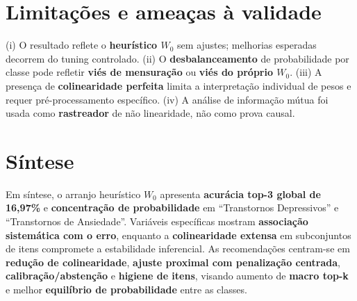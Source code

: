 \documentclass[12pt,a4paper]{article}
\begin{document}
\section{Limitações e ameaças à validade}
(i) O resultado reflete o \textbf{heurístico $W_0$} sem ajustes; melhorias esperadas decorrem do tuning controlado. (ii) O \textbf{desbalanceamento} de probabilidade por classe pode refletir \textbf{viés de mensuração} ou \textbf{viés do próprio $W_0$}. (iii) A presença de \textbf{colinearidade perfeita} limita a interpretação individual de pesos e requer pré-processamento específico. (iv) A análise de informação mútua foi usada como \textbf{rastreador} de não linearidade, não como prova causal.

\section{Síntese}
Em síntese, o arranjo heurístico $W_0$ apresenta \textbf{acurácia top-3 global de 16{,}97\%} e \textbf{concentração de probabilidade} em ``Transtornos Depressivos'' e ``Transtornos de Ansiedade''. Variáveis específicas mostram \textbf{associação sistemática com o erro}, enquanto a \textbf{colinearidade extensa} em subconjuntos de itens compromete a estabilidade inferencial. As recomendações centram-se em \textbf{redução de colinearidade}, \textbf{ajuste proximal com penalização centrada}, \textbf{calibração/abstenção} e \textbf{higiene de itens}, visando aumento de \textbf{macro top-k} e melhor \textbf{equilíbrio de probabilidade} entre as classes.
\end{document}
